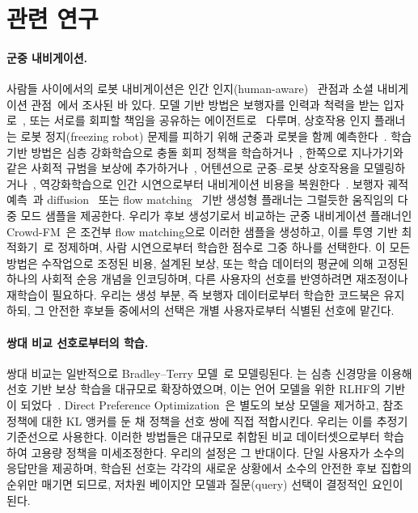 \section{관련 연구}
\label{sec:related}

\paragraph{군중 내비게이션.}
사람들 사이에서의 로봇 내비게이션은 인간 인지(human-aware)~\citep{kruse2013human} 관점과 소셜 내비게이션
관점~\citep{mavrogiannis2023core}에서 조사된 바 있다. 모델 기반 방법은 보행자를 인력과 척력을 받는 입자로~\citep{helbing1995social},
또는 서로를 회피할 책임을 공유하는 에이전트로~\citep{vandenberg2011reciprocal} 다루며, 상호작용 인지 플래너는 로봇 정지(freezing robot) 문제를
피하기 위해 군중과 로봇을 함께 예측한다~\citep{trautman2010unfreezing}.
학습 기반 방법은 심층 강화학습으로 충돌 회피 정책을 학습하거나~\citep{chen2017decentralized}, 한쪽으로 지나가기와 같은 사회적 규범을
보상에 추가하거나~\citep{chen2017socially}, 어텐션으로 군중--로봇 상호작용을 모델링하거나~\citep{chen2019crowd},
역강화학습으로 인간 시연으로부터 내비게이션 비용을 복원한다~\citep{kretzschmar2016socially}.
보행자 궤적 예측~\citep{alahi2016social,gupta2018social}과 diffusion~\citep{janner2022planning} 또는 flow matching~\citep{lipman2023flow}
기반 생성형 플래너는 그럴듯한 움직임의 다중 모드 샘플을 제공한다. 우리가 후보 생성기로서 비교하는 군중 내비게이션 플래너인 Crowd-FM~\citep{singha2026crowdfm}은
조건부 flow matching으로 이러한 샘플을 생성하고, 이를 투영 기반 최적화기~\citep{rastgar2024priest}로 정제하며, 사람 시연으로부터 학습한 점수로 그중 하나를 선택한다.
이 모든 방법은 수작업으로 조정된 비용, 설계된 보상, 또는 학습 데이터의 평균에 의해 고정된 하나의 사회적 순응 개념을 인코딩하며,
다른 사용자의 선호를 반영하려면 재조정이나 재학습이 필요하다. 우리는 생성 부분, 즉 보행자 데이터로부터 학습한 코드북은 유지하되,
그 안전한 후보들 중에서의 선택은 개별 사용자로부터 식별된 선호에 맡긴다.

\paragraph{쌍대 비교 선호로부터의 학습.}
쌍대 비교는 일반적으로 Bradley--Terry 모델~\citep{bradley1952rank}로 모델링된다. \citet{christiano2017deep}는 심층 신경망을 이용해
선호 기반 보상 학습을 대규모로 확장하였으며, 이는 언어 모델을 위한 RLHF의 기반이 되었다~\citep{ouyang2022training}.
Direct Preference Optimization~\citep{rafailov2023direct}은 별도의 보상 모델을 제거하고, 참조 정책에 대한 KL 앵커를 둔 채 정책을 선호 쌍에
직접 적합시킨다. 우리는 이를 추정기 기준선으로 사용한다.
이러한 방법들은 대규모로 취합된 비교 데이터셋으로부터 학습하여 고용량 정책을 미세조정한다. 우리의 설정은 그 반대이다.
단일 사용자가 소수의 응답만을 제공하며, 학습된 선호는 각각의 새로운 상황에서 소수의 안전한 후보 집합의 순위만 매기면 되므로,
저차원 베이지안 모델과 질문(query) 선택이 결정적인 요인이 된다.

